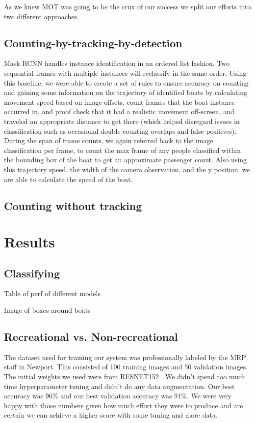 \documentclass[10pt,twocolumn,letterpaper]{article}
\begin{document}
As we knew MOT was going to be the crux of our success we split our efforts into two different approaches.

\subsection{Counting-by-tracking-by-detection}

Mask RCNN handles instance identification in an ordered list fashion.  Two sequential frames with multiple instances will reclassify in the same order.  Using this baseline, we were able to create a set of rules to ensure accuracy on counting and gaining some information on the trajectory of identified boats by calculating movement speed based on image offsets, count frames that the boat instance occurred in, and proof check that it had a realistic movement off-screen, and traveled an appropriate distance to get there (which helped disregard issues in classification such as occasional double counting overlaps and false positives).  During the span of frame counts, we again referred back to the image classification per frame, to count the max frame of any people classified within the bounding box of the boat to get an approximate passenger count. Also using this trajectory speed, the width of the camera observation, and the y position, we are able to calculate the speed of the boat. 

\subsection{Counting without tracking}



\section{Results}

\subsection{Classifying}

Table of perf of different models

Image of boxes around boats

\subsection{Recreational vs. Non-recreational}

The dataset used for training our system was professionally labeled by the MRP staff in Newport. This consisted of 100 training images and 50 validation images. The initial weights we used were from RESNET152 \cite{PyTorch_RESNET152}. We didn't spend too much time hyperparameter tuning and didn't do any data augmentation. Our best accuracy was 96\% and our best validation accuracy was 91\%. We were very happy with those numbers given how much effort they were to produce and are certain we can achieve a higher score with some tuning and more data.
\end{document}

